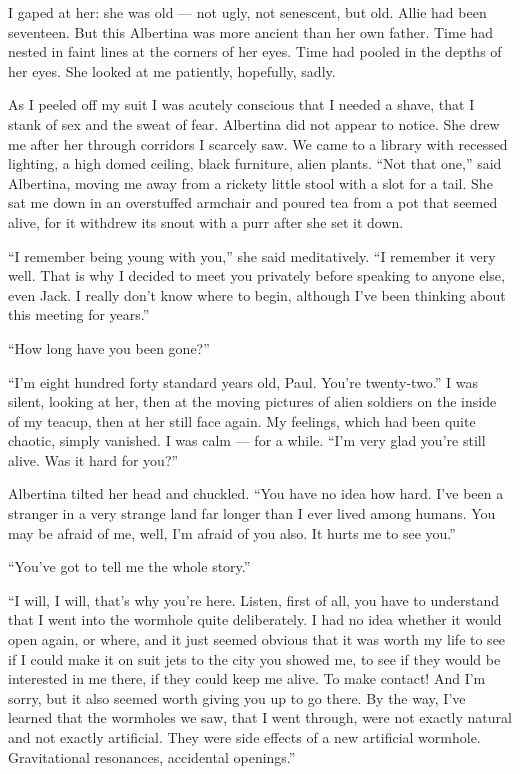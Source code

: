 \documentclass[english,11pt,letterpaper,onecolumn]{scrbook}
\begin{document}
	I gaped at her:  she was old --- not ugly, not senescent, but old.  Allie had been seventeen.  But this Albertina was more ancient than her own father.  Time had nested in faint lines at the corners of her eyes.  Time had pooled in the depths of her eyes.  She looked at me patiently, hopefully, sadly.

	As I peeled off my suit I was acutely conscious that I needed a shave, that I stank of sex and the sweat of fear.  Albertina did not appear to notice.  She drew me after her through corridors I scarcely saw.  We came to a library with recessed lighting, a high domed ceiling, black furniture, alien plants.  ``Not that one,'' said Albertina, moving me away from a rickety little stool with a slot for a tail.  She sat me down in an overstuffed armchair and poured tea from a pot that seemed alive, for it withdrew its snout with a purr after she set it down.

	``I remember being young with you,'' she said meditatively.  ``I remember it very well.  That is why I decided to meet you privately before speaking to anyone else, even Jack.  I really don't know where to begin, although I've been thinking about this meeting for years.''

	``How long have you been gone?''

	``I'm eight hundred forty standard years old, Paul.  You're twenty-two.''
	I was silent, looking at her, then at the moving pictures of alien soldiers on the inside of my teacup, then at her still face again.  My feelings, which had been quite chaotic, simply vanished.  I was calm --- for a while.  ``I'm very glad you're still alive.  Was it hard for you?''

	Albertina tilted her head and chuckled.  ``You have no idea how hard.  I've been a stranger in a very strange land far longer than I ever lived among humans.  You may be afraid of me, well, I'm afraid of you also.  It hurts me to see you.''

	``You've got to tell me the whole story.''

	``I will, I will, that's why you're here.  Listen, first of all, you have to understand that I went into the wormhole quite deliberately.  I had no idea whether it would open again, or where, and it just seemed obvious that it was worth my life to see if I could make it on suit jets to the city you showed me, to see if they would be interested in me there, if they could keep me alive.  To make contact!  And I'm sorry, but it also seemed worth giving you up to go there.  By the way, I've learned that the wormholes we saw, that I went through, were not exactly natural and not exactly artificial.  They were side effects of a new artificial wormhole.  Gravitational resonances, accidental openings.''
\end{document}
